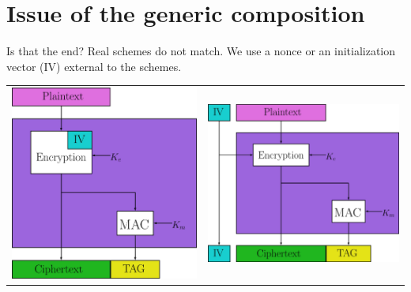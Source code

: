 \documentclass[11pt]{beamer}
\begin{document}
\section{Issue of the generic composition}
\begin{frame}{Is that the end?}
Real schemes do not match.
We use a nonce or an initialization vector (IV) external to the schemes.

\begin{center}
\begin{tabular}{ c c }
	\includegraphics[scale=0.07]{IVThought.jpg} & \includegraphics[scale=0.07]{IVBad.jpg}
\end{tabular}
\end{center}
\end{frame}
\end{document}
